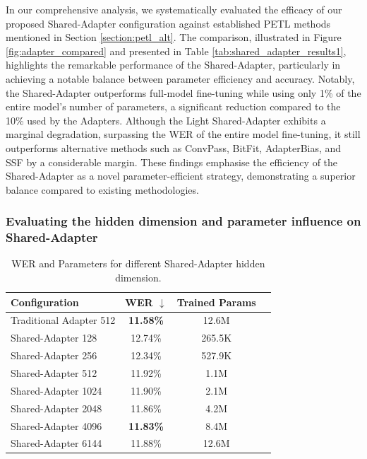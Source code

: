 In our comprehensive analysis, we systematically evaluated the efficacy of our proposed Shared-Adapter configuration against established \ac{PETL} methods mentioned in Section \ref{section:petl_alt}. The comparison, illustrated in Figure \ref{fig:adapter_compared} and presented in Table \ref{tab:shared_adapter_results1}, highlights the remarkable performance of the Shared-Adapter, particularly in achieving a notable balance between parameter efficiency and accuracy. Notably, the Shared-Adapter outperforms full-model fine-tuning while using only 1\% of the entire model's number of parameters, a significant reduction compared to the 10\% used by the Adapters. Although the Light Shared-Adapter exhibits a marginal degradation, surpassing the \ac{WER} of the entire model fine-tuning, it still outperforms alternative methods such as ConvPass, BitFit, AdapterBias, and \ac{SSF} by a considerable margin. These findings emphasise the efficiency of the Shared-Adapter as a novel parameter-efficient strategy, demonstrating a superior balance compared to existing methodologies. 

\subsubsection{Evaluating the hidden dimension and parameter influence on Shared-Adapter}
\begin{table}[ht]
    \centering
    \begin{tabular}{l c c c}
        \hline
        \textbf{Configuration} & \textbf{WER $\downarrow$} & \textbf{Trained Params} \\
        \hline
        Traditional Adapter 512 & \textbf{11.58\%} & 12.6M \\ \hline
        Shared-Adapter 128 & 12.74\% & 265.5K \\
        Shared-Adapter 256 & 12.34\% & 527.9K \\
        Shared-Adapter 512 & 11.92\% & 1.1M \\
        Shared-Adapter 1024 & 11.90\% & 2.1M \\
        Shared-Adapter 2048 & 11.86\% & 4.2M \\
        Shared-Adapter 4096 & \textbf{11.83\%} & 8.4M \\
        Shared-Adapter 6144 & 11.88\% & 12.6M \\ \hline
    \end{tabular}
    \caption{WER and Parameters for different Shared-Adapter hidden dimension.}
    \label{tab:shared_adapter_results}
\end{table}


